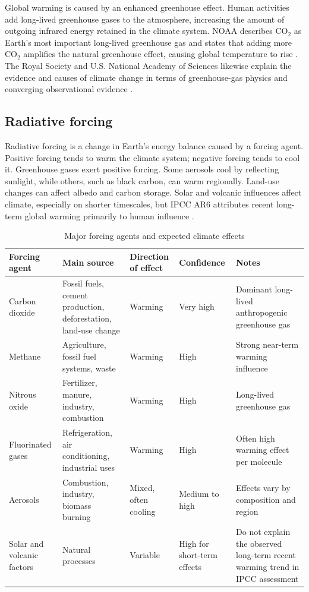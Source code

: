 \documentclass[12pt]{article}
\begin{document}
Global warming is caused by an enhanced greenhouse effect. Human activities add long-lived greenhouse gases to the atmosphere, increasing the amount of outgoing infrared energy retained in the climate system. NOAA describes CO$_2$ as Earth's most important long-lived greenhouse gas and states that adding more CO$_2$ amplifies the natural greenhouse effect, causing global temperature to rise \cite{ref3}. The Royal Society and U.S. National Academy of Sciences likewise explain the evidence and causes of climate change in terms of greenhouse-gas physics and converging observational evidence \cite{ref5}.

\subsection{Radiative forcing}

Radiative forcing is a change in Earth's energy balance caused by a forcing agent. Positive forcing tends to warm the climate system; negative forcing tends to cool it. Greenhouse gases exert positive forcing. Some aerosols cool by reflecting sunlight, while others, such as black carbon, can warm regionally. Land-use changes can affect albedo and carbon storage. Solar and volcanic influences affect climate, especially on shorter timescales, but IPCC AR6 attributes recent long-term global warming primarily to human influence \cite{ref1}.

\begin{table}[htbp]
\centering
\caption{Major forcing agents and expected climate effects}
\begin{tabularx}{\textwidth}{p{2.8cm}Yp{2.4cm}p{2.1cm}Y}
\toprule
Forcing agent & Main source & Direction of effect & Confidence & Notes \\
\midrule
Carbon dioxide & Fossil fuels, cement production, deforestation, land-use change & Warming & Very high & Dominant long-lived anthropogenic greenhouse gas \\
Methane & Agriculture, fossil fuel systems, waste & Warming & High & Strong near-term warming influence \\
Nitrous oxide & Fertilizer, manure, industry, combustion & Warming & High & Long-lived greenhouse gas \\
Fluorinated gases & Refrigeration, air conditioning, industrial uses & Warming & High & Often high warming effect per molecule \\
Aerosols & Combustion, industry, biomass burning & Mixed, often cooling & Medium to high & Effects vary by composition and region \\
Solar and volcanic factors & Natural processes & Variable & High for short-term effects & Do not explain the observed long-term recent warming trend in IPCC assessment \\
\bottomrule
\end{tabularx}
\end{table}
\end{document}
